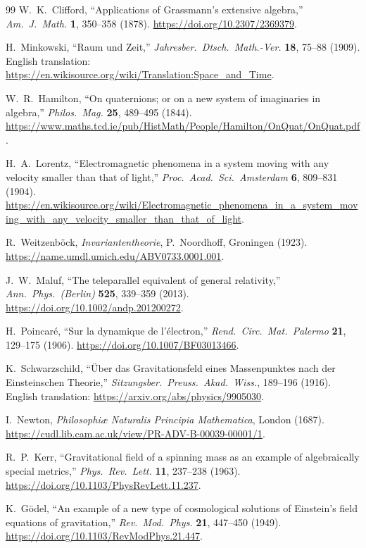 \documentclass[a4paper]{article}
\begin{document}
\begin{thebibliography}{99}
W.~K.~Clifford,
``Applications of Grassmann's extensive algebra,''
\textit{Am.\ J.\ Math.} \textbf{1}, 350--358 (1878).
\url{https://doi.org/10.2307/2369379}.

H.~Minkowski,
``Raum und Zeit,''
\textit{Jahresber.\ Dtsch.\ Math.-Ver.} \textbf{18}, 75--88 (1909).
English translation:
\url{https://en.wikisource.org/wiki/Translation:Space_and_Time}.

W.~R.~Hamilton,
``On quaternions; or on a new system of imaginaries in algebra,''
\textit{Philos.\ Mag.} \textbf{25}, 489--495 (1844).
\url{https://www.maths.tcd.ie/pub/HistMath/People/Hamilton/OnQuat/OnQuat.pdf}.

H.~A.~Lorentz,
``Electromagnetic phenomena in a system moving with any velocity smaller than that of light,''
\textit{Proc.\ Acad.\ Sci.\ Amsterdam} \textbf{6}, 809--831 (1904).
\url{https://en.wikisource.org/wiki/Electromagnetic_phenomena_in_a_system_moving_with_any_velocity_smaller_than_that_of_light}.

R.~Weitzenb\"ock,
\textit{Invariantentheorie},
P.~Noordhoff, Groningen (1923).
\url{https://name.umdl.umich.edu/ABV0733.0001.001}.

J.~W.~Maluf,
``The teleparallel equivalent of general relativity,''
\textit{Ann.\ Phys.\ (Berlin)} \textbf{525}, 339--359 (2013).
\url{https://doi.org/10.1002/andp.201200272}.

H.~Poincar\'e,
``Sur la dynamique de l'\'electron,''
\textit{Rend.\ Circ.\ Mat.\ Palermo} \textbf{21}, 129--175 (1906).
\url{https://doi.org/10.1007/BF03013466}.

K.~Schwarzschild,
``\"Uber das Gravitationsfeld eines Massenpunktes nach der Einsteinschen Theorie,''
\textit{Sitzungsber.\ Preuss.\ Akad.\ Wiss.}, 189--196 (1916).
English translation:
\url{https://arxiv.org/abs/physics/9905030}.

I.~Newton,
\textit{Philosophi\ae{} Naturalis Principia Mathematica},
London (1687).
\url{https://cudl.lib.cam.ac.uk/view/PR-ADV-B-00039-00001/1}.

R.~P.~Kerr,
``Gravitational field of a spinning mass as an example of algebraically special metrics,''
\textit{Phys.\ Rev.\ Lett.} \textbf{11}, 237--238 (1963).
\url{https://doi.org/10.1103/PhysRevLett.11.237}.

K.~G\"odel,
``An example of a new type of cosmological solutions of Einstein's field equations of gravitation,''
\textit{Rev.\ Mod.\ Phys.} \textbf{21}, 447--450 (1949).
\url{https://doi.org/10.1103/RevModPhys.21.447}.


\end{thebibliography}
\end{document}
